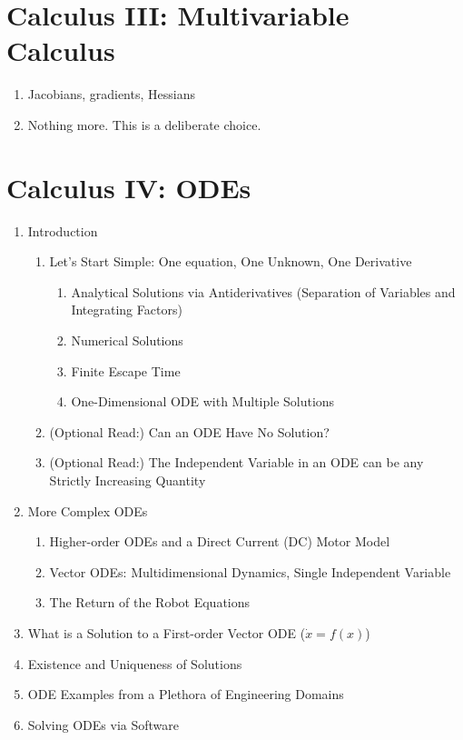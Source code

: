 \section*{Calculus III: Multivariable Calculus}
\begin{enumerate}
\item Jacobians, gradients, Hessians
\item Nothing more. This is a deliberate choice.
\end{enumerate}

\section*{Calculus IV: ODEs}
\begin{enumerate}
\item Introduction 
\begin{enumerate}
    \item Let’s Start Simple: One equation, One Unknown, One Derivative 
    \begin{enumerate}
  \item Analytical Solutions via Antiderivatives (Separation of Variables and Integrating Factors)
  \item Numerical Solutions 
  \item Finite Escape Time 
  \item One-Dimensional ODE with Multiple Solutions 
  \end{enumerate} 
  \item (Optional Read:) Can an ODE Have No Solution? 
  \item (Optional Read:) The Independent Variable in an ODE can be any Strictly Increasing Quantity 
\end{enumerate} 
\item More Complex ODEs
\begin{enumerate}
  \item Higher-order ODEs and a Direct Current (DC) Motor Model 
  \item Vector ODEs: Multidimensional Dynamics, Single Independent Variable 
  \item The Return of the Robot Equations 
\end{enumerate}  
  \item What is a Solution to a First-order Vector ODE ($\dot{x} = f(x)$)
  \item Existence and Uniqueness of Solutions 
  \item ODE Examples from a Plethora of Engineering Domains 
  \item Solving ODEs via Software

\end{enumerate}
